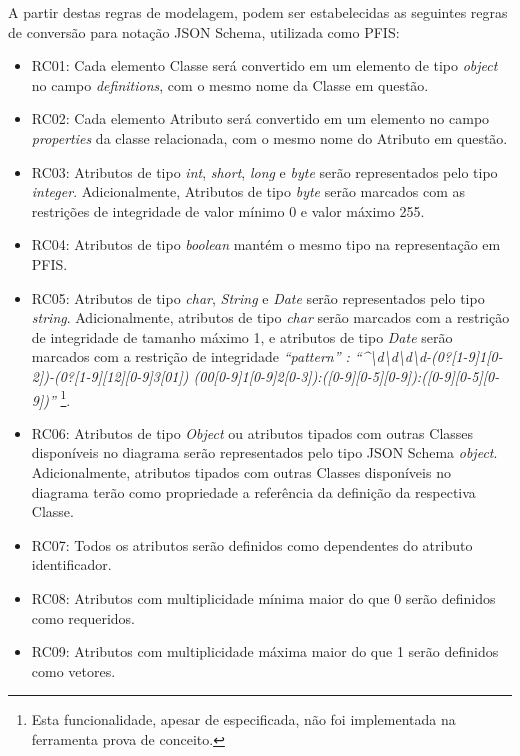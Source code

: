 A partir destas regras de modelagem, podem ser estabelecidas as seguintes regras de conversão para notação JSON Schema, utilizada como PFIS:

\begin{itemize}
    \item RC01: Cada elemento Classe será convertido em um elemento de tipo \textit{object} no campo \textit{definitions}, com o mesmo nome da Classe em questão.

    \item RC02: Cada elemento Atributo será convertido em um elemento no campo \textit{properties} da classe relacionada, com o mesmo nome do Atributo em questão.

    \item RC03: Atributos de tipo \textit{int}, \textit{short}, \textit{long} e \textit{byte} serão representados pelo tipo \textit{integer}. Adicionalmente, Atributos de tipo \textit{byte} serão marcados com as restrições de integridade de valor mínimo 0 e valor máximo 255.

    \item RC04: Atributos de tipo \textit{boolean} mantém o mesmo tipo na representação em PFIS.

    \item RC05: Atributos de tipo \textit{char}, \textit{String} e \textit{Date} serão representados pelo tipo \textit{string}. Adicionalmente, atributos de tipo \textit{char} serão marcados com a restrição de integridade de tamanho máximo 1, e atributos de tipo \textit{Date} serão marcados com a restrição de integridade \textit{``pattern'' : ``\^{}\textbackslash{}d\textbackslash{}d\textbackslash{}d\textbackslash{}d-(0?[1-9]\textbar{}1[0-2])-(0?[1-9]\textbar{}[12][0-9]\textbar{}3[01]) (00\textbar{}[0-9]\textbar{}1[0-9]\textbar{}2[0-3]):([0-9]\textbar{}[0-5][0-9]):([0-9]\textbar{}[0-5][0-9])\textdollar{}''} \footnote{Esta funcionalidade, apesar de especificada, não foi implementada na ferramenta prova de conceito.}.

    \item RC06: Atributos de tipo \textit{Object} ou atributos tipados com outras Classes disponíveis no diagrama serão representados pelo tipo JSON Schema \textit{object}. Adicionalmente, atributos tipados com outras Classes disponíveis no diagrama terão como propriedade a referência da definição da respectiva Classe.

    \item RC07: Todos os atributos serão definidos como dependentes do atributo identificador.

    \item RC08: Atributos com multiplicidade mínima maior do que 0 serão definidos como requeridos.

    \item RC09: Atributos com multiplicidade máxima maior do que 1 serão definidos como vetores.
\end{itemize}

